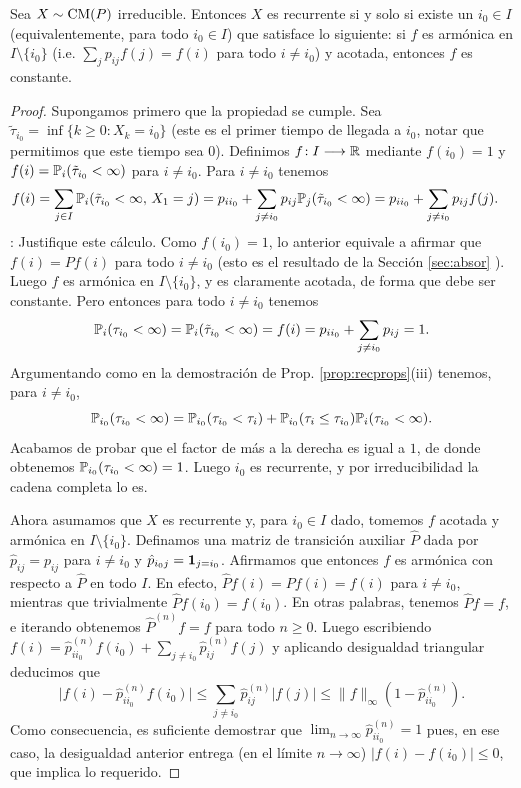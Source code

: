 \begin{thm}
Sea $X\sim\text{\upshape{CM}}(P)$ irreducible.
Entonces $X$ es recurrente si y solo si existe un $i_0\in I$ (equivalentemente, para todo $i_0\in I$) que satisface lo siguiente: si $f$ es armónica en $I\setminus\{i_0\}$ (i.e. $\sum_{j}p_{ij}f(j)=f(i)$ para todo $i\neq i_0$) y acotada, entonces $f$ es constante.
\end{thm}

\begin{proof}
Supongamos primero que la propiedad se cumple.
Sea $\tilde\tau_{i_0}=\inf\{k\geq0\!:X_k=i_0\}$ (este es el primer tiempo de llegada a $i_0$, notar que permitimos que este tiempo sea $0$).
Definimos $f\!:I\longrightarrow\mathbb{R}$ mediante $f(i_0)=1$ y $f(i)=\mathbb{P}_i(\tilde\tau_{i_0}<\infty)$ para $i\neq i_0$.
Para $i\neq i_0$ tenemos
\begin{align}
f(i)&=\sum_{j\in I}\mathbb{P}_{i}(\tilde\tau_{i_0}<\infty,\,X_1=j)=p_{ii_0}+\sum_{j\neq i_0}p_{ij}\mathbb{P}_{j}(\tilde\tau_{i_0}<\infty)=p_{ii_0}+\sum_{j\neq i_0}p_{ij}f(j).
\end{align}
\uexer: Justifique este cálculo.
Como $f(i_0)=1$, lo anterior equivale a afirmar que $f(i)=Pf(i)$ para todo $i\neq i_0$ (esto es el resultado de la Sección \ref{sec:absor} \ucmark).
Luego $f$ es armónica en $I\setminus\{i_0\}$, y es claramente acotada, de forma que debe ser constante.
Pero entonces para todo $i\neq i_0$ tenemos 
\[\mathbb{P}_i(\tau_{i_0}<\infty)=\mathbb{P}_i(\tilde\tau_{i_0}<\infty)=f(i)=p_{ii_0}+\sum_{j\neq i_0}p_{ij}=1.\]
Argumentando como en la demostración de Prop. \ref{prop:recprops}(iii) tenemos, para $i\neq i_0$,
\[\mathbb{P}_{i_0}(\tau_{i_0}<\infty)=\mathbb{P}_{i_0}(\tau_{i_0}<\tau_i)+\mathbb{P}_{i_0}(\tau_i\leq\tau_{i_0})\mathbb{P}_i(\tau_{i_0}<\infty).\]
Acabamos de probar que el factor de más a la derecha es igual a $1$, de donde obtenemos $\mathbb{P}_{i_0}(\tau_{i_0}<\infty)=1$.
Luego $i_0$ es recurrente, y por irreducibilidad la cadena completa lo es.

Ahora asumamos que $X$ es recurrente y, para $i_0\in I$ dado, tomemos $f$ acotada y armónica en $I\setminus\{i_0\}$.
Definamos una matriz de transición auxiliar $\hat P$ dada por $\hat p_{ij}=p_{ij}$ para $i\neq i_0$ y $\hat p_{i_0j}=\mathbf{1}_{j=i_0}$.
Afirmamos que entonces $f$ es armónica con respecto a $\hat P$ en todo $I$.
En efecto, $\hat Pf(i)=Pf(i)=f(i)$ para $i\neq i_0$, mientras que trivialmente $\hat Pf(i_0)=f(i_0)$.
En otras palabras, tenemos $\hat Pf=f$, e iterando obtenemos $\hat P^{(n)}f=f$ para todo $n\geq0$.
Luego escribiendo $f(i)=\hat p^{(n)}_{ii_0}f(i_0)+\sum_{j\neq i_0}\hat p^{(n)}_{ij}f(j)$ y aplicando  desigualdad triangular deducimos que
\[\big|f(i)-\hat p^{(n)}_{ii_0}f(i_0)\big|\leq\sum_{j\neq i_0}\hat p^{(n)}_{ij}|f(j)|\leq\|f\|_\infty(1-\hat p^{(n)}_{ii_0}).\]
Como consecuencia, es suficiente demostrar que $\lim_{n\to\infty}\hat p^{(n)}_{ii_0}=1$ pues, en ese caso, la desigualdad anterior entrega (en el límite $n\to\infty$) $|f(i)-f(i_0)|\leq0$, que implica lo requerido.


\end{proof}
